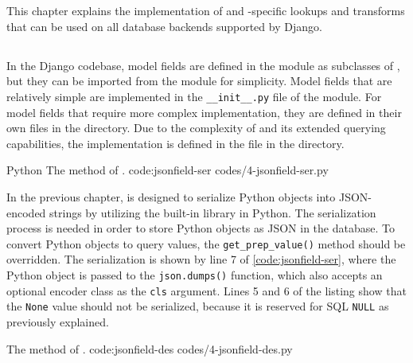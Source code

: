 \chapter{\babEmpat}

This chapter explains the implementation of  and
-specific lookups and transforms that can be used on all
database backends supported by Django.

\section{}

In the Django codebase, model fields are defined in the
 module as subclasses of , but they
can be imported from the  module for simplicity. Model
fields that are relatively simple are implemented in the \verb|__init__.py|
file of the module. For model fields that require more complex implementation,
they are defined in their own files in the  directory. Due to the
complexity of  and its extended querying capabilities, the
implementation is defined in the  file in the 
directory.

\listing
{Python}
{The  method of .}
{code:jsonfield-ser}
{codes/4-jsonfield-ser.py}

In the previous chapter,  is designed to serialize Python
objects into JSON-encoded strings by utilizing the built-in  library
in Python. The serialization process is needed in order to store Python objects
as JSON in the database. To convert Python objects to query values, the
\verb|get_prep_value()| method should be overridden. The serialization is shown
by line 7 of \autoref{code:jsonfield-ser}, where the Python object is passed
to the \verb|json.dumps()| function, which also accepts an optional encoder
class as the \verb|cls| argument. Lines 5 and 6 of the listing show that the
\verb|None| value should not be serialized, because it is reserved for SQL
\verb|NULL| as previously explained.

{The  method of .}
{code:jsonfield-des}
{codes/4-jsonfield-des.py}

